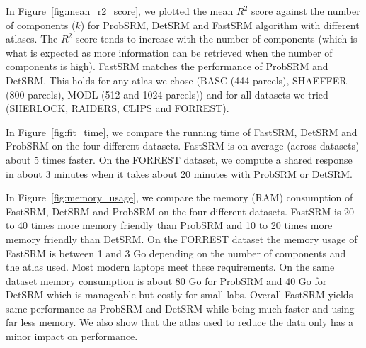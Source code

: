 In Figure~\ref{fig:mean_r2_score}, we plotted the mean $R^2$ score against the number of components ($k$) for ProbSRM, DetSRM and FastSRM algorithm with different atlases.
%
The $R^2$ score tends to increase with the number of components (which is what is expected as more information can be retrieved when the number of components is high).
%
FastSRM matches the performance of ProbSRM and DetSRM. This holds for any atlas we chose (BASC (444 parcels), SHAEFFER (800 parcels), MODL (512 and 1024 parcels)) and for all datasets we tried (SHERLOCK, RAIDERS, CLIPS and FORREST). 

In Figure~\ref{fig:fit_time}, we compare the running time of FastSRM, DetSRM and ProbSRM on the four different datasets.
%
FastSRM is on average (across datasets) about 5 times faster.
%
On the FORREST dataset, we compute a shared response in about 3 minutes when it takes about 20 minutes with ProbSRM or DetSRM.

In Figure~\ref{fig:memory_usage}, we compare the memory (RAM) consumption of FastSRM, DetSRM and ProbSRM on the four different datasets.
%
FastSRM is 20 to 40 times more memory friendly than ProbSRM and 10 to 20 times more memory friendly than DetSRM. On the FORREST dataset the memory usage of FastSRM is between 1 and 3 Go depending on the number of components and the atlas used. Most modern laptops meet these requirements. On the same dataset memory consumption is about 80 Go for ProbSRM and 40 Go for DetSRM which is manageable but costly for small labs.
%
Overall FastSRM yields same performance as ProbSRM and DetSRM while being much faster and using far less memory. We also show that the atlas used to reduce the data only has a minor impact on performance.


